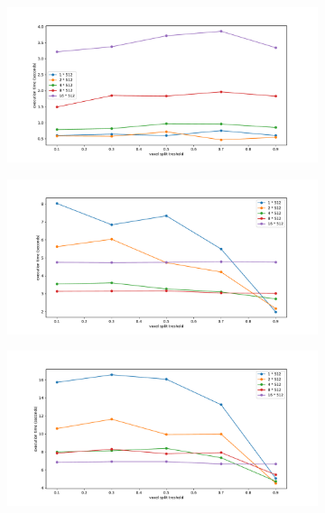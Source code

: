 \documentclass[12pt, oneside]{report}
\begin{document}
\begin{figure}[H]

\begin{subfigure}[b]{0.5\linewidth}
  \centering
	\includegraphics[width=\linewidth,keepaspectratio]{Images/SummaryOptimisation/results_25.pdf}
	\caption{}
	\label{summary_res25}
\end{subfigure}
\begin{subfigure}[b]{0.5\linewidth}
  \centering
	\includegraphics[width=\linewidth,keepaspectratio]{Images/SummaryOptimisation/results_50.pdf}
	\caption{}
	\label{summary_res50}
\end{subfigure}
\begin{subfigure}[b]{0.5\linewidth}
  \centering
	\includegraphics[width=\linewidth,keepaspectratio]{Images/SummaryOptimisation/results_75.pdf}

\end{subfigure}
\end{figure}
\end{document}
